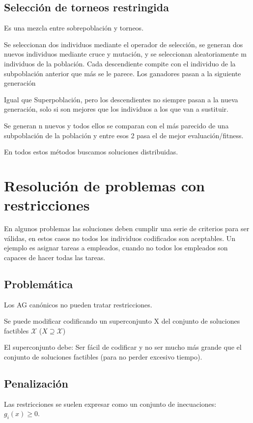 \documentclass[12pt, twoside, openright]{report} %
\begin{document}
\subsection{Selección de torneos restringida}
Es una mezcla entre sobrepoblación y torneos.

Se seleccionan dos individuos mediante el operador de selección, se generan dos nuevos individuos mediante cruce y mutación, y se seleccionan aleatoriamente m individuos de la población. Cada descendiente compite con el individuo de la subpoblación anterior que más se le parece. Los ganadores pasan a la siguiente generación

Igual que Superpoblación, pero los descendientes no siempre pasan a la nueva generación, solo si son mejores que los individuos a los que van a sustituir.

Se generan n nuevos y todos ellos se comparan con el más parecido de una subpoblación de la población y entre esos 2 pasa el de mejor evaluación/fitness.

En todos estos métodos buscamos soluciones distribuidas.

\section{Resolución de problemas con restricciones}
En algunos problemas las soluciones deben cumplir una serie de criterios para ser válidas, en estos casos no todos los individuos codificados son aceptables. Un ejemplo es asignar tareas a empleados, cuando no todos los empleados son capaces de hacer todas las tareas.

\subsection{Problemática}
Los AG canónicos no pueden tratar restricciones.

Se puede modificar codificando un superconjunto X del conjunto de soluciones factibles $\mathcal{X}$ ($X \supseteq \mathcal{X}$)

El superconjunto debe: Ser fácil de codificar y no ser mucho más grande que el conjunto de soluciones factibles (para no perder excesivo tiempo).

\subsection{Penalización}
Las restricciones se suelen expresar como un conjunto de inecuaciones: $g_i(x) \geq 0$.
\end{document}
